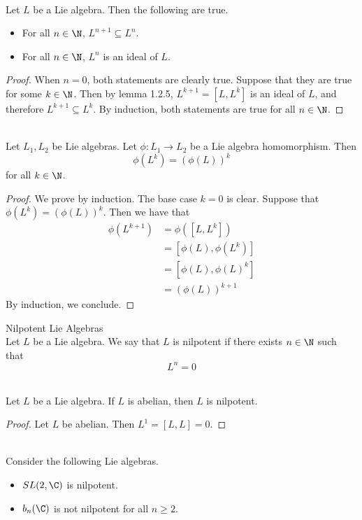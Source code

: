 \documentclass[a4paper]{article}
\begin{document}
\begin{lmm}{}{} \\Let $L$ be a Lie algebra. Then the following are true. 
\begin{itemize}
\item For all $n\in\N$, $L^{n+1}\subseteq L^n$. 
\item For all $n\in\N$, $L^n$ is an ideal of $L$. 
\end{itemize} 
\begin{proof}
When $n=0$, both statements are clearly true. Suppose that they are true for some $k\in\N$. Then by lemma 1.2.5, $L^{k+1}=[L,L^k]$ is an ideal of $L$, and therefore $L^{k+1}\subseteq L^k$. By induction, both statements are true for all $n\in\N$. 
\end{proof}
\end{lmm}

\begin{lmm}{}{} \\Let $L_1,L_2$ be Lie algebras. Let $\phi:L_1\to L_2$ be a Lie algebra homomorphism. Then $$\phi(L^k)=(\phi(L))^k$$ for all $k\in\N$. 
\begin{proof}
We prove by induction. The base case $k=0$ is clear. Suppose that $\phi(L^k)=(\phi(L))^k$. Then we have that 
\begin{align*}
\phi(L^{k+1})&=\phi([L,L^k])\\
&=[\phi(L),\phi(L^k)]\\
&=[\phi(L),\phi(L)^k]\\
&=(\phi(L))^{k+1}
\end{align*}
By induction, we conclude. 
\end{proof}
\end{lmm}

\begin{defn}{Nilpotent Lie Algebras}{} \\Let $L$ be a Lie algebra. We say that $L$ is nilpotent if there exists $n\in\N$ such that $$L^n=0$$
\end{defn}

\begin{lmm}{}{} \\Let $L$ be a Lie algebra. If $L$ is abelian, then $L$ is nilpotent. 
\begin{proof}
Let $L$ be abelian. Then $L^1=[L,L]=0$. 
\end{proof}
\end{lmm}

\begin{eg}{}{} \\Consider the following Lie algebras. 
\begin{itemize}
\item $SL(2,\C)$ is nilpotent. 
\item $b_n(\C)$ is not nilpotent for all $n\geq 2$. 
\end{itemize}
\end{eg}
\end{document}
